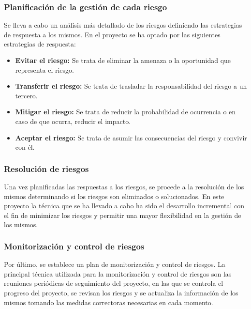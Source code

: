 \subsubsection*{Planificación de la gestión de cada riesgo}
Se lleva a cabo un análisis más detallado de los riesgos definiendo las estrategias de respuesta a los mismos. 
En el proyecto se ha optado por las siguientes estrategias de respuesta:
\begin{itemize}
    \item \textbf{Evitar el riesgo:} Se trata de eliminar la amenaza o la oportunidad que representa el riesgo.
    \item \textbf{Transferir el riesgo:} Se trata de trasladar la responsabilidad del riesgo a un tercero.
    \item \textbf{Mitigar el riesgo:} Se trata de reducir la probabilidad de ocurrencia o en caso de que ocurra, reducir el impacto.
    \item \textbf{Aceptar el riesgo:} Se trata de asumir las consecuencias del riesgo y convivir con él.
\end{itemize}

\subsubsection*{Resolución de riesgos}
Una vez planificadas las respuestas a los riesgos, se procede a la resolución de los mismos determinando si los riesgos son eliminados o solucionados. 
En este proyecto la técnica que se ha llevado a cabo ha sido el desarrollo incremental con el fin de minimizar los riesgos y permitir una mayor flexibilidad en la gestión de los mismos.

\subsubsection*{Monitorización y control de riesgos}
Por último, se establece un plan de monitorización y control de riesgos. 
La principal técnica utilizada para la monitorización y control de riesgos son las reuniones periódicas de seguimiento del proyecto, en las que se controla el progreso del proyecto, se revisan los riesgos y se actualiza la información de los mismos tomando las medidas correctoras necesarias en cada momento.
